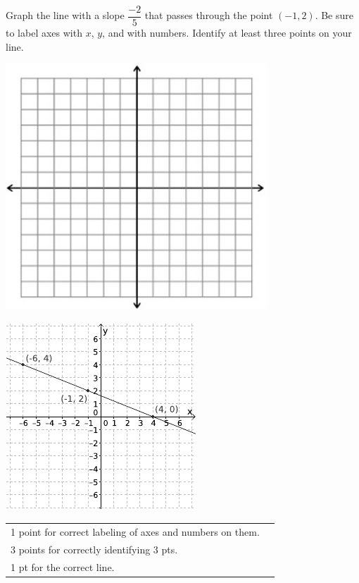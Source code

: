 {
	Graph the line with a slope $\dfrac{-2}{5}$ that passes through the point $(-1, 2)$. Be sure to label axes with $x$, $y$, and with numbers. Identify at least three points on your line.\begin{onlyproblem}\begin{center}\includegraphics{fig-graphpaper.png}\end{center}\end{onlyproblem} \begin{onlysolution}\begin{center}\includegraphics{fig095-08-d-answer}\end{center}\end{onlysolution}
}
{
	\begin{tabular}{l r}
	1 point for correct labeling of axes and numbers on them.\\
	3 points for correctly identifying 3 pts.\\
	1 pt for the correct line.\\
	\end{tabular}
}
